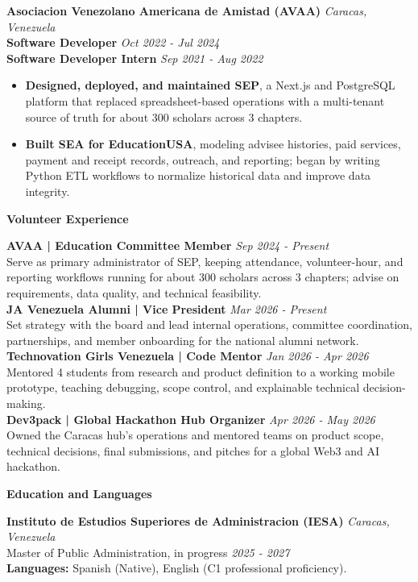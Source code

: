 \documentclass[10pt]{article}
\newcommand{\sectiontitle}[1]{%
    \vspace{4pt}
    \begin{center}
        \textbf{#1}
    \end{center}
    \vspace{-5pt}
}
\begin{document}
\vspace{2pt}
\textbf{Asociacion Venezolano Americana de Amistad (AVAA)} \hfill \textit{Caracas, Venezuela} \\
\textbf{Software Developer} \hfill \textit{Oct 2022 - Jul 2024} \\
\textbf{Software Developer Intern} \hfill \textit{Sep 2021 - Aug 2022}
\begin{itemize}
    \item \textbf{Designed, deployed, and maintained SEP}, a Next.js and PostgreSQL platform that replaced spreadsheet-based operations with a multi-tenant source of truth for about 300 scholars across 3 chapters.
    \item \textbf{Built SEA for EducationUSA}, modeling advisee histories, paid services, payment and receipt records, outreach, and reporting; began by writing Python ETL workflows to normalize historical data and improve data integrity.
\end{itemize}

\sectiontitle{Volunteer Experience}
\textbf{AVAA | Education Committee Member} \hfill \textit{Sep 2024 - Present} \\
Serve as primary administrator of SEP, keeping attendance, volunteer-hour, and reporting workflows running for about 300 scholars across 3 chapters; advise on requirements, data quality, and technical feasibility. \\
\textbf{JA Venezuela Alumni | Vice President} \hfill \textit{Mar 2026 - Present} \\
Set strategy with the board and lead internal operations, committee coordination, partnerships, and member onboarding for the national alumni network. \\
\textbf{Technovation Girls Venezuela | Code Mentor} \hfill \textit{Jan 2026 - Apr 2026} \\
Mentored 4 students from research and product definition to a working mobile prototype, teaching debugging, scope control, and explainable technical decision-making. \\
\textbf{Dev3pack | Global Hackathon Hub Organizer} \hfill \textit{Apr 2026 - May 2026} \\
Owned the Caracas hub's operations and mentored teams on product scope, technical decisions, final submissions, and pitches for a global Web3 and AI hackathon.

\sectiontitle{Education and Languages}
\textbf{Instituto de Estudios Superiores de Administracion (IESA)} \hfill \textit{Caracas, Venezuela} \\
Master of Public Administration, in progress \hfill \textit{2025 - 2027} \\
\textbf{Languages:} Spanish (Native), English (C1 professional proficiency).
\end{document}
